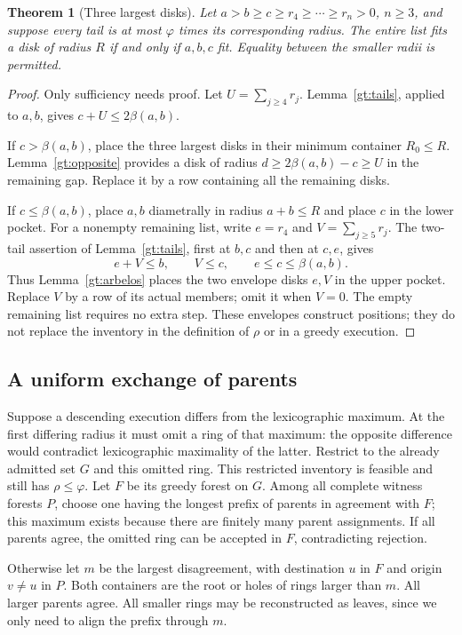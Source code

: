 \documentclass[11pt]{article}
\newtheorem{theorem}{Theorem}
\theoremstyle{definition}
\begin{document}
\begin{theorem}[Three largest disks]\label{gt:three}
Let $a>b\ge c\ge r_4\ge\cdots\ge r_n>0$, $n\ge3$, and
suppose every tail is at most $\varphi$ times its corresponding radius.
The entire list fits a disk of radius $R$ if and only if $a,b,c$ fit.
Equality between the smaller radii is permitted.
\end{theorem}
\begin{proof}
Only sufficiency needs proof. Let $U=\sum_{j\ge4}r_j$.
Lemma~\ref{gt:tails}, applied to $a,b$, gives
$c+U\le2\beta(a,b)$.

If $c>\beta(a,b)$, place the three largest disks in their minimum
container $R_0\le R$. Lemma~\ref{gt:opposite} provides a disk
of radius $d\ge2\beta(a,b)-c\ge U$ in the remaining gap. Replace
it by a row containing all the remaining disks.

If $c\le\beta(a,b)$, place $a,b$ diametrally in radius $a+b\le R$
and place $c$ in the lower pocket. For a nonempty remaining list,
write $e=r_4$ and $V=\sum_{j\ge5}r_j$. The two-tail assertion
of Lemma~\ref{gt:tails}, first at $b,c$ and then at $c,e$, gives
\[
 e+V\le b,\qquad V\le c,\qquad e\le c\le\beta(a,b).
\]
Thus Lemma~\ref{gt:arbelos} places the two envelope disks $e,V$
in the upper pocket. Replace $V$ by a row of its actual members;
omit it when $V=0$. The empty remaining list requires no extra step.
These envelopes construct positions; they do not replace the inventory
in the definition of $\rho$ or in a greedy execution.
\end{proof}

\subsection{A uniform exchange of parents}

Suppose a descending execution differs from the lexicographic maximum.
At the first differing radius it must omit a ring of that maximum:
the opposite difference would contradict lexicographic maximality of
the latter. Restrict to the already admitted set $G$ and this omitted ring.
This restricted inventory is feasible and still has $\rho\le\varphi$.
Let $F$ be its greedy forest on $G$. Among all complete witness forests
$P$, choose one having the longest prefix of parents in agreement
with $F$; this maximum exists because there are finitely many parent
assignments. If all parents agree, the omitted ring can be accepted
in $F$, contradicting rejection.

Otherwise let $m$ be the largest disagreement, with destination $u$
in $F$ and origin $v\ne u$ in $P$. Both containers are the root or
holes of rings larger than $m$. All larger parents agree. All smaller
rings may be reconstructed as leaves, since we only need to align
the prefix through $m$.
\end{document}
